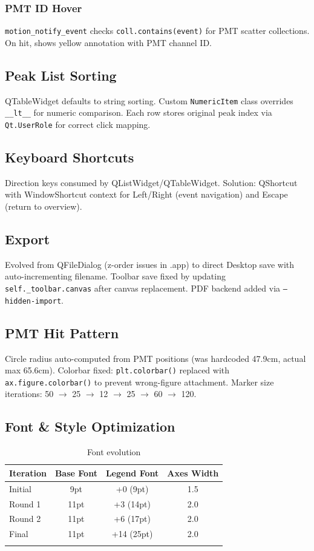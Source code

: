 \documentclass[12pt,a4paper]{article}
\begin{document}
\subsubsection{PMT ID Hover}
\texttt{motion\_notify\_event} checks \texttt{coll.contains(event)} for PMT scatter collections. On hit, shows yellow annotation with PMT channel ID.

\subsection{Peak List Sorting}
QTableWidget defaults to string sorting. Custom \texttt{NumericItem} class overrides \texttt{\_\_lt\_\_} for numeric comparison. Each row stores original peak index via \texttt{Qt.UserRole} for correct click mapping.

\subsection{Keyboard Shortcuts}
Direction keys consumed by QListWidget/QTableWidget. Solution: QShortcut with WindowShortcut context for Left/Right (event navigation) and Escape (return to overview).

\subsection{Export}
Evolved from QFileDialog (z-order issues in .app) to direct Desktop save with auto-incrementing filename. Toolbar save fixed by updating \texttt{self.\_toolbar.canvas} after canvas replacement. PDF backend added via \texttt{--hidden-import}.

\subsection{PMT Hit Pattern}
Circle radius auto-computed from PMT positions (was hardcoded 47.9cm, actual max 65.6cm). Colorbar fixed: \texttt{plt.colorbar()} replaced with \texttt{ax.figure.colorbar()} to prevent wrong-figure attachment. Marker size iterations: 50 $\to$ 25 $\to$ 12 $\to$ 25 $\to$ 60 $\to$ 120.

\subsection{Font \& Style Optimization}

\begin{longtable}{|l|c|c|c|}
\hline
\textbf{Iteration} & \textbf{Base Font} & \textbf{Legend Font} & \textbf{Axes Width} \\
\hline
Initial & 9pt & +0 (9pt) & 1.5 \\
Round 1 & 11pt & +3 (14pt) & 2.0 \\
Round 2 & 11pt & +6 (17pt) & 2.0 \\
Final & 11pt & +14 (25pt) & 2.0 \\
\hline
\caption{Font evolution}
\end{longtable}
\end{document}
